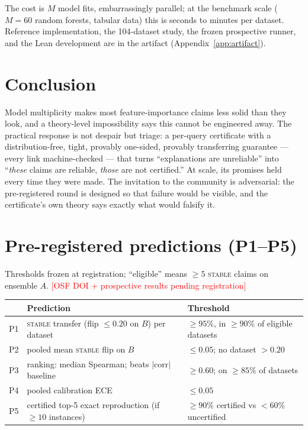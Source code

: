 \documentclass[10pt]{article}
\newcommand{\stab}{\textsc{stable}}
\newcommand{\osfpending}{\textcolor{red}{[OSF DOI + prospective results pending registration]}}
\begin{document}
The cost is $M$ model fits, embarrassingly parallel; at the benchmark scale
($M{=}60$ random forests, tabular data) this is seconds to minutes per dataset.
Reference implementation, the 104-dataset study, the frozen prospective runner, and the
Lean development are in the artifact (Appendix~\ref{app:artifact}).

\section{Conclusion}

Model multiplicity makes most feature-importance claims less solid than they look, and a
theory-level impossibility says this cannot be engineered away. The practical response is
not despair but triage: a per-query certificate with a distribution-free, tight,
provably one-sided, provably transferring guarantee --- every link machine-checked ---
that turns ``explanations are unreliable'' into ``\emph{these} claims are reliable,
\emph{those} are not certified.'' At scale, its promises held every time they were made.
The invitation to the community is adversarial: the pre-registered round is designed so
that failure would be visible, and the certificate's own theory says exactly what would
falsify it.




\appendix

\section{Pre-registered predictions (P1--P5)}
\label{app:prereg}

Thresholds frozen at registration; ``eligible'' means $\ge5$ \stab{} claims on ensemble
$A$. \osfpending

\begin{center}\small
\begin{tabular}{@{}lll@{}}
\toprule
 & Prediction & Threshold \\
\midrule
P1 & \stab{} transfer (flip $\le0.20$ on $B$) per dataset & $\ge95\%$, in $\ge90\%$ of eligible datasets \\
P2 & pooled mean \stab{} flip on $B$ & $\le0.05$; no dataset $>0.20$ \\
P3 & ranking: median Spearman; beats $|\mathrm{corr}|$ baseline & $\ge0.60$; on $\ge85\%$ of datasets \\
P4 & pooled calibration ECE & $\le0.05$ \\
P5 & certified top-5 exact reproduction (if $\ge10$ instances) & $\ge90\%$ certified vs $<60\%$ uncertified \\
\bottomrule
\end{tabular}
\end{center}
\end{document}
